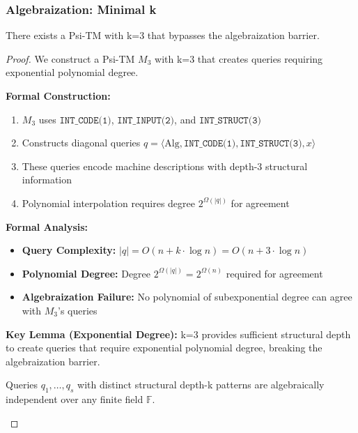 \documentclass[11pt]{article}
\begin{document}
\subsubsection{Algebraization: Minimal k}

\begin{theorem}[Algebraization Bypass with k=3]
\label{thm:algebraization-k3}
There exists a Psi-TM with k=3 that bypasses the algebraization barrier.
\end{theorem}

\begin{proof}
We construct a Psi-TM $M_3$ with k=3 that creates queries requiring exponential polynomial degree.

\textbf{Formal Construction:}
\begin{enumerate}
\item $M_3$ uses $\texttt{INT\_CODE(1)}$, $\texttt{INT\_INPUT(2)}$, and $\texttt{INT\_STRUCT(3)}$
\item Constructs diagonal queries $q = \langle \text{Alg}, \texttt{INT\_CODE(1)}, \texttt{INT\_STRUCT(3)}, x \rangle$
\item These queries encode machine descriptions with depth-3 structural information
\item Polynomial interpolation requires degree $2^{\Omega(|q|)}$ for agreement
\end{enumerate}

\textbf{Formal Analysis:}
\begin{itemize}
\item \textbf{Query Complexity:} $|q| = O(n + k \cdot \log n) = O(n + 3 \cdot \log n)$
\item \textbf{Polynomial Degree:} Degree $2^{\Omega(|q|)} = 2^{\Omega(n)}$ required for agreement
\item \textbf{Algebraization Failure:} No polynomial of subexponential degree can agree with $M_3$'s queries
\end{itemize}

\textbf{Key Lemma (Exponential Degree):} k=3 provides sufficient structural depth to create queries that require exponential polynomial degree, breaking the algebraization barrier.

\begin{lemma}
Queries $q_1, \ldots, q_s$ with distinct structural depth-k patterns are algebraically independent over any finite field $\mathbb{F}$.
\end{lemma}


\end{proof}
\end{document}
